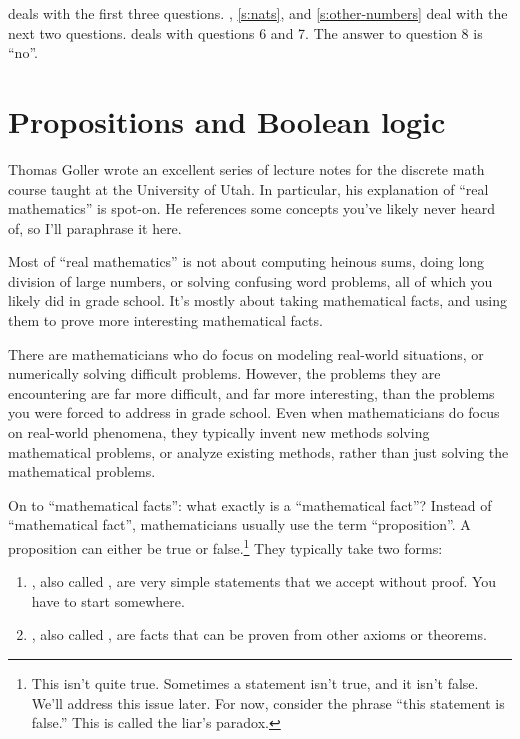  deals with the first three
questions. , \cref{s:nats}, and \cref{s:other-numbers}
deal with the next two questions.  deals with
questions 6 and 7. The answer to question 8 is ``no''.

\section{Propositions and Boolean logic}
\label{s:props-proofs}

Thomas Goller wrote an excellent series of lecture notes for the
discrete math course taught at the University of
Utah. \cite{goller-discrete} In particular, his explanation of ``real
mathematics'' is spot-on. He references some concepts you've likely
never heard of, so I'll paraphrase it here.

Most of ``real mathematics'' is not about computing heinous sums,
doing long division of large numbers, or solving confusing word
problems, all of which you likely did in grade school. It's mostly
about taking mathematical facts, and using them to prove more
interesting mathematical facts.

There are mathematicians who do focus on modeling real-world
situations, or numerically solving difficult problems. However, the
problems they are encountering are far more difficult, and far more
interesting, than the problems you were forced to address in grade
school. Even when mathematicians do focus on real-world phenomena,
they typically invent new methods solving mathematical problems, or
analyze existing methods, rather than just solving the mathematical
problems.

On to ``mathematical facts'': what exactly is a ``mathematical fact''?
Instead of ``mathematical fact'', mathematicians usually use the term
``proposition''. A proposition can either be true or
false.\footnote{This isn't quite true. Sometimes a statement isn't
  true, and it isn't false. We'll address this issue later. For now,
  consider the phrase ``this statement is false.'' This is called the
  liar's paradox.}  They typically take two forms:

\begin{enumerate}
\item {}, also called , are very simple
  statements that we accept without proof. You have to start
  somewhere.
\item {}, also called , are facts that can
  be proven from other axioms or theorems.
\end{enumerate}

